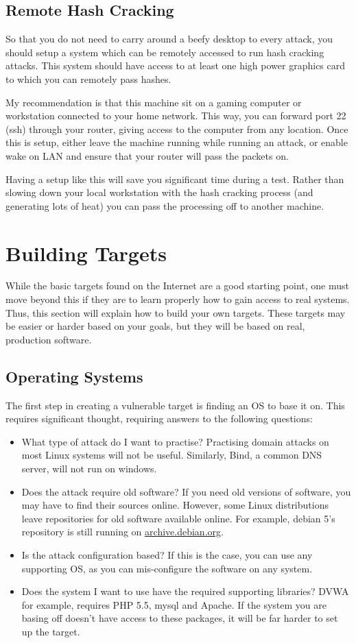 		\subsection{Remote Hash Cracking}
			So that you do not need to carry around a beefy desktop to every attack, you should setup a system which can be remotely accessed to run hash cracking attacks. 
			This system should have access to at least one high power graphics card to which you can remotely pass hashes. 

			My recommendation is that this machine sit on a gaming computer or workstation connected to your home network. 
			This way, you can forward port 22 (ssh) through your router, giving access to the computer from any location. 
			Once this is setup, either leave the machine running while running an attack, or enable wake on LAN and ensure that your router will pass the packets on. 

			Having a setup like this will save you significant time during a test. 
			Rather than slowing down your local workstation with the hash cracking process (and generating lots of heat) you can pass the processing off to another machine. 


	\section{Building Targets}
		While the basic targets found on the Internet are a good starting point, one must move beyond this if they are to learn properly how to gain access to real systems. 
		Thus, this section will explain how to build your own targets. 
		These targets may be easier or harder based on your goals, but they will be based on real, production software. 

		\subsection{Operating Systems}
			The first step in creating a vulnerable target is finding an OS to base it on. 
			This requires significant thought, requiring answers to the following questions:
			\begin{itemize}
				\item What type of attack do I want to practise?
					Practising domain attacks on most Linux systems will not be useful. 
					Similarly, Bind, a common DNS server, will not run on windows. 
				\item Does the attack require old software?
					If you need old versions of software, you may have to find their sources online. 
					However, some Linux distributions leave repositories for old software available online. 
					For example, debian 5's repository is still running on \url{archive.debian.org}.
				\item Is the attack configuration based?
					If this is the case, you can use any supporting OS, as you can mis-configure the software on any system. 
				\item Does the system I want to use have the required supporting libraries?
					DVWA for example, requires PHP 5.5, mysql and Apache. 
					If the system you are basing off doesn't have access to these packages, it will be far harder to set up the target. 
			\end{itemize}
